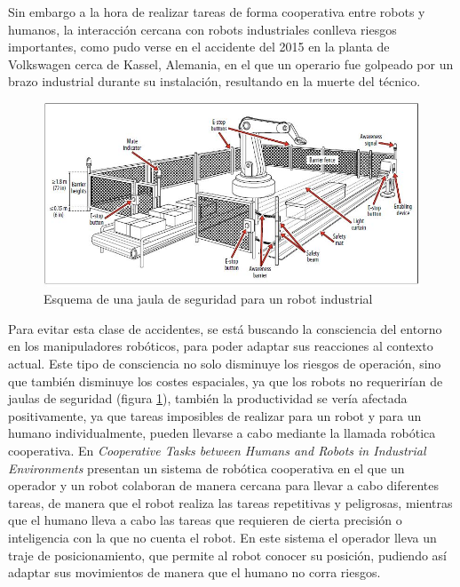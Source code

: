  Sin embargo a la hora de realizar tareas de forma cooperativa entre robots y humanos, la interacción cercana con robots industriales conlleva riesgos importantes, como pudo verse en el accidente del 2015\cite{vwaccident2015} en la planta de Volkswagen cerca de Kassel, Alemania, en el que un operario fue golpeado por un brazo industrial  durante su instalación, resultando en la muerte del técnico.
  \begin{figure}
	\centering
	\includegraphics[width=1\linewidth]{imagenes/robotcell.jpeg}
	\caption{Esquema de una jaula de seguridad para un robot industrial}
	\label{fig:robot-cell}
\end{figure} 
 Para evitar esta clase de accidentes, se está buscando la consciencia del entorno en los manipuladores robóticos, para poder adaptar sus reacciones al contexto actual. Este tipo de consciencia no solo disminuye los riesgos de operación, sino que también disminuye los costes espaciales, ya que los robots no requerirían de jaulas de seguridad (figura \ref{fig:robot-cell}), también la productividad se vería afectada positivamente, ya que tareas imposibles de realizar para un robot y para un humano individualmente, pueden llevarse a cabo mediante la llamada robótica cooperativa.
 En \textit{Cooperative Tasks between Humans and Robots in Industrial Environments}\cite{corrales2012cooperative} presentan un sistema de robótica cooperativa en el que un operador y un robot colaboran de manera cercana para llevar a cabo diferentes tareas, de manera que el robot realiza las tareas repetitivas y peligrosas, mientras que el humano lleva a cabo las tareas que requieren de cierta precisión o inteligencia con la que no cuenta el robot. En este sistema el operador lleva un traje de posicionamiento, que permite al robot conocer su posición, pudiendo así adaptar sus movimientos de manera que el humano no corra riesgos.
 
 
 
